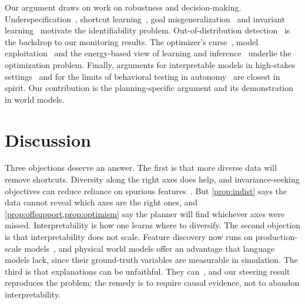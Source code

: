 \documentclass[11pt]{article}
\theoremstyle{definition}\newtheorem{definition}{Definition}
\begin{document}
Our argument draws on work on robustness and decision-making. Underspecification~\citep{damour2022underspecification}, shortcut learning~\citep{geirhos2020shortcut}, goal misgeneralization~\citep{langosco2022goal} and invariant learning~\citep{arjovsky2019irm,scholkopf2021causal} motivate the identifiability problem. Out-of-distribution detection~\citep{hendrycks2017baseline,lee2018mahalanobis,lakshminarayanan2017ensembles} is the backdrop to our monitoring results. The optimizer's curse~\citep{smith2006optimizer}, model exploitation~\citep{janner2019mbpo} and the energy-based view of learning and inference~\citep{lecun2006ebm} underlie the optimization problem. Finally, arguments for interpretable models in high-stakes settings~\citep{rudin2019stop,doshivelez2017rigorous,casper2024blackbox} and for the limits of behavioral testing in autonomy~\citep{kalra2016driving,koopman2016challenges} are closest in spirit. Our contribution is the planning-specific argument and its demonstration in world models.

\section{Discussion}\label{sec:discussion}
Three objections deserve an answer. The first is that more diverse data will remove shortcuts. Diversity along the right axes does help, and invariance-seeking objectives can reduce reliance on spurious features~\citep{arjovsky2019irm,scholkopf2021causal}. But \cref{prop:indist} says the data cannot reveal which axes are the right ones, and \cref{prop:offsupport,prop:optimism} say the planner will find whichever axes were missed. Interpretability is how one learns where to diversify. The second objection is that interpretability does not scale. Feature discovery now runs on production-scale models~\citep{templeton2024scaling}, and physical world models offer an advantage that language models lack, since their ground-truth variables are measurable in simulation. The third is that explanations can be unfaithful. They can~\citep{adebayo2018sanity,elazar2021amnesic}, and our steering result reproduces the problem; the remedy is to require causal evidence, not to abandon interpretability.
\end{document}
